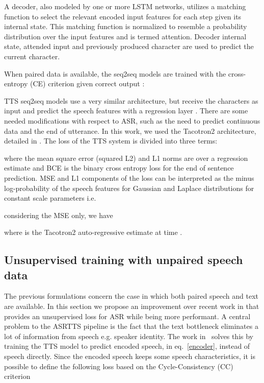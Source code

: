 \documentclass[a4paper]{article}
\begin{document}
A decoder, also modeled by one or more LSTM networks, utilizes a matching function to select the relevant encoded input features for each step  given its internal state. This matching function is normalized to resemble a probability distribution over the input features and is termed attention. Decoder internal state, attended input and previously produced character are used to predict the current character. 

When paired data is available, the seq2seq models are trained with the cross-entropy (CE) criterion given correct output :


TTS seq2seq models use a very similar architecture, but receive the characters as input  and predict the speech features with a regression layer . There are some needed modifications with respect to ASR, such as the need to predict continuous data and the end of utterance. In this work, we used the Tacotron2 architecture, detailed in \cite{shen2018natural}. The loss of the TTS system is divided into three terms:

where the mean square error (squared L2) and L1 norms are over a regression estimate  and BCE is the binary cross entropy loss for the end of sentence prediction. MSE and L1 components of the loss can be interpreted as the minus log-probability of the speech features for Gaussian and Laplace distributions for constant scale parameters i.e.

considering the MSE only, we have

where  is the Tacotron2 auto-regressive estimate at time .

\subsection{Unsupervised training with unpaired speech data}

The previous formulations concern the case in which both paired speech  and text  are available. 
In this section we propose an improvement over recent work in \cite{hori2018cycle} that provides an unsupervised loss for ASR while being more performant. A central problem to the ASRTTS pipeline is the fact that the text bottleneck eliminates a lot of information from speech e.g. speaker identity. The work in~\cite{hori2018cycle} solves this by training the TTS model to predict encoded speech,  in eq.~\eqref{encoder}, instead of speech  directly. Since the encoded speech keeps some speech characteristics, it is possible to define the following loss based on the Cycle-Consistency (CC) criterion 
\end{document}
